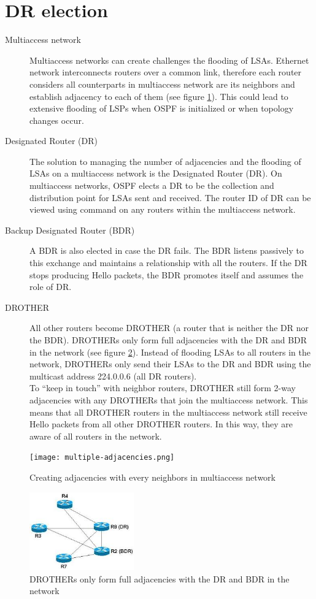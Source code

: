\section{DR election}
\begin{description}
	\item[Multiaccess network] Multiaccess networks can create challenges the flooding of LSAs. Ethernet network interconnects routers over a common link, therefore each router considers all counterparts in multiaccess network are its neighbors and establish adjacency to each of them (see figure \ref{multiple-adjacencies}). This could lead to extensive flooding of LSPs when OSPF is initialized or when topology changes occur.
	\item[Designated Router (DR)] The solution to managing the number of adjacencies and the flooding of LSAs on a multiaccess network is the Designated Router (DR). On multiaccess networks, OSPF elects a DR to be the collection and distribution point for LSAs sent and received. The router ID of DR can be viewed using  command on any routers within the multiaccess network.
	\item[Backup Designated Router (BDR)] A BDR is also elected in case the DR fails. The BDR listens passively to this exchange and maintains a relationship with all the routers. If the DR stops producing Hello packets, the BDR promotes itself and assumes the role of DR.
	\item[DROTHER] All other routers become DROTHER (a router that is neither the DR nor the BDR). DROTHERs only form full adjacencies with the DR and BDR in the network (see figure \ref{DR-adjacency}). Instead of flooding LSAs to all routers in the network, DROTHERs only send their LSAs to the DR and BDR using the multicast address 224.0.0.6 (all DR routers). \\
	To ``keep in touch'' with neighbor routers, DROTHER still form 2-way adjacencies with any DROTHERs that join the multiaccess network. This means that all DROTHER routers in the multiaccess network still receive Hello packets from all other DROTHER routers. In this way, they are aware of all routers in the network.
	\end{description}
\begin{figure}[hbtp]
	\centering
	\texttt{[image: multiple-adjacencies.png]} 
	\caption{Creating adjacencies with every neighbors in multiaccess network}
	\label{multiple-adjacencies}
	\end{figure}
\begin{figure}[hbtp]
	\centering
	\includegraphics[width=0.4\textwidth]{pictures/dr-bdr.jpeg}
	\caption{DROTHERs only form full adjacencies with the DR and BDR in the network}
	\label{DR-adjacency}
	\end{figure}
